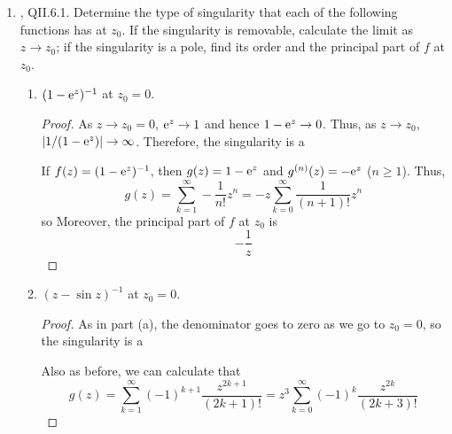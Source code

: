 \documentclass[../psets.tex]{subfiles}
\begin{document}
\begin{enumerate}[ref={A.\arabic*}]
\begin{enumerate}
        \begin{proof}
            As in part (c), if $\rho$ is a root of unity and $\mu=1$, then $a_k$ can only be nonzero if $k$ is divisible by the denominator of $\arg\rho$ in reduced form. If $\rho$ has an irrational argument, the equation may not add much of any new information. More generally, power series that satisfy this equation tend to be determined on $\C$ by their values on some subset of $\C$, be it half the plane (as in $f(-z)=f(z)$ or $f(-z)=2f(z)$), one quadrant (as in $f(iz)=f(z)$), or some other region.
        \end{proof}
    \end{enumerate}
    \item \textcite{bib:FischerLieb}, QII.6.1. Determine the type of singularity that each of the following functions has at $z_0$. If the singularity is removable, calculate the limit as $z\to z_0$; if the singularity is a pole, find its order and the principal part of $f$ at $z_0$.
    \begin{enumerate}
        \item $(1-\e[z])^{-1}$ at $z_0=0$.
        \begin{proof}
            As $z\to z_0=0$, $\e[z]\to 1$ and hence $1-\e[z]\to 0$. Thus, as $z\to z_0$, $|1/(1-\e[z])|\to\infty$. Therefore, the singularity is a \par
            If $f(z)=(1-\e[z])^{-1}$, then $g(z)=1-\e[z]$ and $g^{(n)}(z)=-\e[z]$ ($n\geq 1$). Thus,
            \begin{equation*}
                g(z) = \sum_{k=1}^\infty -\frac{1}{n!}z^n
                = -z\sum_{k=0}^\infty\frac{1}{(n+1)!}z^n
            \end{equation*}
            so  Moreover, the principal part of $f$ at $z_0$ is
            \begin{equation*}
                \boxed{-\frac{1}{z}}
            \end{equation*}
        \end{proof}
        \item $(z-\sin z)^{-1}$ at $z_0=0$.
        \begin{proof}
            As in part (a), the denominator goes to zero as we go to $z_0=0$, so the singularity is a \par
            Also as before, we can calculate that
            \begin{equation*}
                g(z) = \sum_{k=1}^\infty(-1)^{k+1}\frac{z^{2k+1}}{(2k+1)!}
                = z^3\sum_{k=0}^\infty(-1)^k\frac{z^{2k}}{(2k+3)!}

\end{equation*}
\end{proof}
\end{enumerate}
\end{enumerate}
\end{document}
